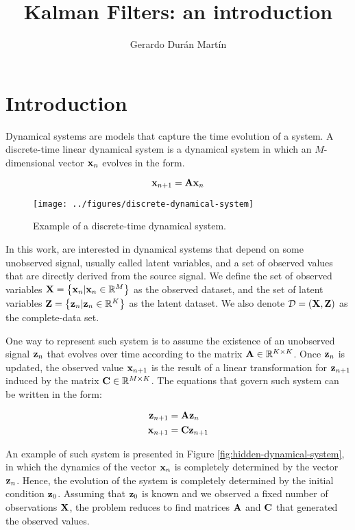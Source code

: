 \documentclass[11pt]{article}
\title{Kalman Filters: an introduction}
\author{Gerardo Durán Martín}
\begin{document}
\maketitle

\section{Introduction}

Dynamical systems are models that capture the time evolution of a system. A discrete-time linear dynamical system is a dynamical system in which an $M$-dimensional vector ${\bf x}_n$ evolves in the form.

\begin{equation}
	{\bf x}_{n+1} = {\bf A x}_n
\end{equation}

\begin{figure}[h!]
	\centering
	\texttt{[image: ../figures/discrete-dynamical-system]}
	\caption{Example of a discrete-time dynamical system.}
	\label{fig:discrete-dynamical-system}
\end{figure}



In this work, are interested in dynamical systems that depend on some unobserved signal, usually called latent variables, and a set of observed values that are directly derived from the source signal. We define the set of observed variables ${\bf X}=\left\{{\bf x}_n \vert {\bf x}_n \in \mathbb{R}^M\right\}$ as the observed dataset, and the set of latent variables ${\bf Z}=\left\{{\bf z}_n \vert {\bf z}_n \in \mathbb{R}^K\right\}$ as the latent dataset. We also denote $\mathcal{D} = ({\bf X}, {\bf Z})$ as the complete-data set.

One way to represent such system is to assume the existence of an unobserved signal ${\bf z}_n$ that evolves over time according to the matrix ${\bf A}\in\mathbb{R}^{K\times K}$. Once ${\bf z}_{n}$ is updated, the observed value ${\bf x}_{n+1}$ is the result of a linear transformation for ${\bf z}_{n+1}$ induced by the matrix ${\bf C}\in \mathbb{R}^{M\times K}$. The equations that govern such system can be written in the form:

\begin{align*}
	{\bf z}_{n+1} &= {\bf A} {\bf z}_{n}\\
	{\bf x}_{n+1} &= {\bf C} {\bf z}_{n+1}
\end{align*}

An example of such system is presented in Figure \ref{fig:hidden-dynamical-system}, in which the dynamics of the vector ${\bf x}_n$ is completely determined by the vector ${\bf z}_n$. Hence, the evolution of the system is completely determined by the initial condition ${\bf z}_0$. Assuming that ${\bf z}_0$ is known and we observed a fixed number of observations ${\bf X}$, the problem reduces to find matrices ${\bf A}$ and ${\bf C}$ that generated the observed values.
\end{document}
